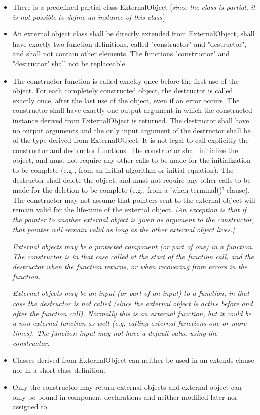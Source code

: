 \documentclass[10pt,a4paper]{report}
\begin{document}
\begin{itemize}
\item
  There is a predefined partial class ExternalObject {[}\emph{since the class
  is partial, it is not possible to define an instance of this class}{[}.
\item
  An external object class shall be directly extended from
  ExternalObject, shall have exactly two function definitions, called
  "constructor" and "destructor", and shall not contain other elements.
  The functions "constructor" and "destructor" shall not be replaceable.
\item
  The constructor function is called exactly once before the first use
  of the object. For each completely constructed object, the destructor
  is called exactly once, after the last use of the object, even if an
  error occurs. The constructor shall have exactly one output argument
  in which the constructed instance derived from ExternalObject is
  returned. The destructor shall have no output arguments and the only
  input argument of the destructor shall be of the type derived from
  ExternalObject. It is not legal to call explicitly the constructor and
  destructor functions. The constructor shall initialize the object, and
  must not require any other calls to be made for the initialization to
  be complete (e.g., from an initial algorithm or initial equation). The
  destructor shall delete the object, and must not require any other
  calls to be made for the deletion to be complete (e.g., from a 'when
  terminal()' clause). The constructor may not assume that pointers sent
  to the external object will remain valid for the life-time of the
  external object. \emph{{[}An exception is that if the pointer to
  another external object is given as argument to the constructor, that
  pointer will remain valid as long as the other external object
  lives.{]}}

  \emph{External objects may be a protected component (or part of one)
  in a function. The constructor is in that case called at the start of
  the function call, and the destructor when the function returns, or
  when recovering from errors in the function.}

  \emph{External objects may be an input (or part of an input) to a
  function, in that case the destructor is not called (since the
  external object is active before and after the function call).
  Normally this is an external function, but it could be a non-external
  function as well (e.g. calling external functions one or more times).
  The function input may not have a default value using the
  constructor.}
\item
  Classes derived from ExternalObject can neither be used in an
  extends-clause nor in a short class definition.
\item
  Only the constructor may return external objects and external object
  can only be bound in component declarations and neither modified later
  nor assigned to.


\end{itemize}
\end{document}
